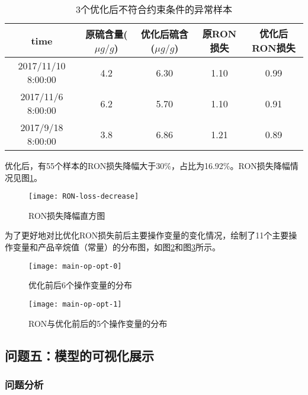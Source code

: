 \documentclass[bwprint]{gmcmthesis}
\begin{document}
\begin{table}[htb]
	\caption{3个优化后不符合约束条件的异常样本}\label{tab:exceed-S-constraint} \centering
	\begin{tabular}{ccccc}
		\toprule[1.5pt]
		time &  原硫含量($\mu g/g$) &  优化后硫含($\mu g/g$) &  原RON损失 &  优化后RON损失 \\
		\midrule[1pt]
		2017/11/10 8:00:00 &              4.2 &               6.30 &    1.10 &      0.99 \\
		2017/11/6 8:00:00 &              6.2 &               5.70 &    1.10 &      0.91 \\
		2017/9/18 8:00:00 &              3.8 &               6.86 &    1.21 &      0.89 \\  
		\bottomrule[1.5pt]
	\end{tabular}
\end{table}

优化后，有55个样本的RON损失降幅大于30\%，占比为16.92\%。RON损失降幅情况见图\ref{img:RON-loss-descrease}。

\begin{figure}[htb]
	\centering
	\texttt{[image: RON-loss-decrease]}
	\caption{RON损失降幅直方图}
	\label{img:RON-loss-descrease}
\end{figure}


为了更好地对比优化RON损失前后主要操作变量的变化情况，绘制了11个主要操作变量和产品辛烷值（常量）的分布图，如图\ref{img:main-op-opt-0}和图\ref{img:main-op-opt-1}所示。

\begin{figure}[htb]
	\centering
	\texttt{[image: main-op-opt-0]}
	\caption{优化前后6个操作变量的分布}
	\label{img:main-op-opt-0}
\end{figure}

\begin{figure}[htb]
	\centering
	\texttt{[image: main-op-opt-1]}
	\caption{RON与优化前后的5个操作变量的分布}
	\label{img:main-op-opt-1}
\end{figure}

\FloatBarrier
\subsection{问题五：模型的可视化展示}

\FloatBarrier
\subsubsection{问题分析}
\end{document}
